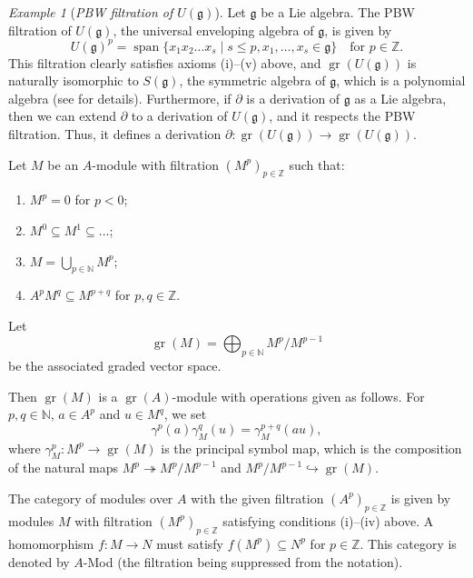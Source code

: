\documentclass[a4paper, 12pt, reqno]{amsart}
\theoremstyle{remark}
\newtheorem{example}[theorem]{Example}
\DeclareMathOperator{\gr}{gr}
\DeclareMathOperator{\vspan}{span}
\begin{document}
\begin{example}[\emph{PBW filtration of $U(\mathfrak{g})$}]
  \label{exa:1}
  Let $\mathfrak{g}$ be a Lie algebra.
  The PBW filtration of $U(\mathfrak{g})$, the universal enveloping algebra of $\mathfrak{g}$, is given by
  \begin{equation*}
    U(\mathfrak{g})^p = \vspan\{x_1x_2\dots x_s \mid s \le p, x_1, \dots, x_s \in \mathfrak{g}\} \quad \text{for $p \in \mathbb{Z}$}.
  \end{equation*}
  This filtration clearly satisfies axioms (i)--(v) above, and $\gr(U(\mathfrak{g}))$ is naturally isomorphic to $S(\mathfrak{g})$, the symmetric algebra of $\mathfrak{g}$, which is a polynomial algebra (see \cite[\S2]{dixmier_enveloping_1996} for details).
  Furthermore, if $\partial$ is a derivation of $\mathfrak{g}$ as a Lie algebra, then we can extend $\partial$ to a derivation of $U(\mathfrak{g})$, and it respects the PBW filtration.
  Thus, it defines a derivation $\partial: \gr(U(\mathfrak{g})) \to \gr(U(\mathfrak{g}))$.
\end{example}

Let $M$ be an $A$-module with filtration $(M^p)_{p \in \mathbb{Z}}$ such that:
\begin{enumerate}
\item $M^p = 0$ for $p < 0$;
\item $M^0 \subseteq M^1 \subseteq \dots$;
\item $M = \bigcup_{p \in \mathbb{N}}M^p$;
\item $A^pM^q \subseteq M^{p + q}$ for $p, q \in \mathbb{Z}$.
\end{enumerate}
Let
\begin{equation*}
  \gr(M) = \bigoplus_{p \in \mathbb{N}}M^p/M^{p - 1}
\end{equation*}
be the associated graded vector space.

Then $\gr(M)$ is a $\gr(A)$-module with operations given as follows.
For $p, q \in \mathbb{N}$, $a \in A^p$ and $u \in M^q$, we set
\begin{equation*}
  \gamma^p(a)\gamma^q_M(u) = \gamma^{p + q}_M(au),
\end{equation*}
where $\gamma^p_M: M^p \to \gr(M)$ is the principal symbol map, which is the composition of the natural maps $M^p \twoheadrightarrow M^p/M^{p - 1}$ and $M^p/M^{p - 1} \hookrightarrow \gr(M)$.

The category of modules over $A$ with the given filtration $(A^p)_{p \in \mathbb{Z}}$ is given by modules $M$ with filtration $(M^p)_{p \in \mathbb{Z}}$ satisfying conditions (i)--(iv) above.
A homomorphism $f: M \to N$ must satisfy $f(M^p) \subseteq N^p$ for $p \in \mathbb{Z}$.
This category is denoted by $A$-Mod (the filtration being suppressed from the notation).
\end{document}
